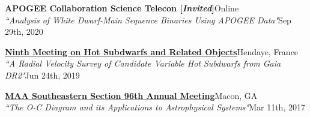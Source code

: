 \documentclass[letterpaper,12pt]{article}
\begin{document}
\vspace{3mm}
\noindent{}

\begin{etaremune}
    \item {\small\textbf{APOGEE Collaboration Science Telecon [\textit{Invited}]}}\hfill{\small Online}\\
    {\footnotesize \textit{``Analysis of White Dwarf-Main Sequence Binaries Using APOGEE Data"}\hfill \footnotesize Sep 29th, 2020}
    \item \href{https://sdob9.sciencesconf.org/}{{\small\textbf{Ninth Meeting on Hot Subdwarfs and Related Objects}}}\hfill{\small Hendaye, France}\\
    {\footnotesize \textit{``A Radial Velocity Survey of Candidate Variable Hot Subdwarfs from Gaia DR2"}\hfill \footnotesize Jun 24th, 2019}
    \item \href{http://sections.maa.org/southeastern/2017Conference/}{{\small\textbf{MAA Southeastern Section 96th Annual Meeting}}}\hfill{\small Macon, GA}\\
    {\footnotesize \textit{``The O-C Diagram and its Applications to Astrophysical Systems"}\hfill \footnotesize Mar 11th, 2017}
\end{etaremune}

\vspace{3mm}
\noindent{}
\end{document}
